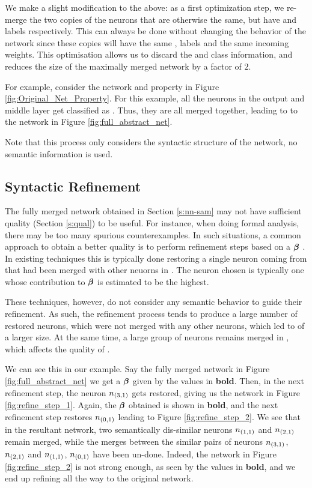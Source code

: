We make a slight modification to the above: as a first optimization step, we
re-merge the two copies of the \abs neurons that are otherwise the same, but
have \posc and \negc labels respectively. This can always be done without
changing the behavior of the network since these copies will have the same \inc,
\dec labels and the same incoming weights.  This optimisation
allows us to discard the \posc and \negc class information, and reduces the size
of the maximally merged network by a factor of $2$.




For example, consider the network and property in Figure
\ref{fig:Original_Net_Property}. For this example, all the neurons in the output
and middle layer get classified as \inc. Thus, they are all merged together,
leading to to the network in Figure \ref{fig:full_abstract_net}.

Note that this process only considers the syntactic structure of the network, no
semantic information is used.

\subsection{ Syntactic Refinement }

The fully merged network obtained in Section \ref{s:nn-sam} may not have
sufficient quality (Section \ref{s:qual}) to be useful. For instance, when doing
formal analysis, there may be too many spurious counterexamples. In such
situations, a common approach to obtain a better quality \abs is to perform
refinement steps based on a \gencex $\boldsymbol{\beta}$ \cite{cegar-nn,
cegarette, cleverest-nn}. In
existing techniques this is typically done restoring a single neuron coming from \cnc
that had been merged with other neuorns in \abs. The neuron chosen is typically one 
whose contribution to $\boldsymbol{\beta}$ is estimated to be the highest.

These techniques, however, do not consider any semantic behavior to guide their
refinement. As such, the refinement process tends to produce a large number of
restored neurons, which were not merged with any other neurons, which led 
to \abs of a larger size. At the same time, a large group of neurons remains 
merged in \abs, which affects the quality of \abs. 

We can see this in our example. Say the fully merged network in Figure
\ref{fig:full_abstract_net} we get a $\boldsymbol{\beta}$ given by the values in \textbf{bold}.
Then, in the next refinement step, the neuron $n_{(3,1)}$ gets restored, giving
us the network in Figure \ref{fig:refine_step_1}. Again, the $\boldsymbol{\beta}$
obtained is shown in \textbf{bold}, and the next refinement step restores $n_{(0,1)}$
leading to Figure \ref{fig:refine_step_2}. We see that in the resultant network,
two semantically dis-similar neurons $n_{(1,1)}$ and $n_{(2,1)}$ remain merged,
while the merges between the similar pairs of neurons $n_{(3,1)}$, $n_{(2,1)}$
and $n_{(1,1)}$, $n_{(0,1)}$ have been un-done. Indeed, the network in Figure
\ref{fig:refine_step_2} is not strong enough, as seen by the values in \textbf{bold}, and
we end up refining all the way to the original network.



